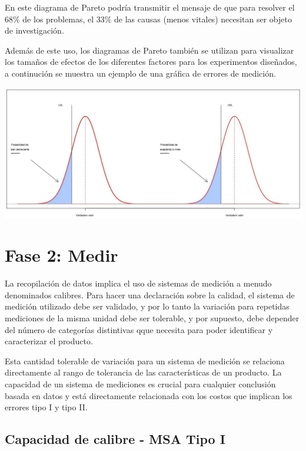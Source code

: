 \documentclass[
]{book}
\begin{document}
En este diagrama de Pareto podría transmitir el mensaje de que para resolver el \(68\%\) de los problemas, el \(33 \%\) de las causas (menos vitales) necesitan ser objeto de investigación.

Además de este uso, los diagramas de Pareto también se utilizan para visualizar los tamaños de efectos de los diferentes factores para los experimentos diseñados, a continución se muestra un ejemplo de una gráfica de errores de medición.

\includegraphics[width=7.29167in,height=\textheight]{graficos/erroresMedida.png}

\hypertarget{fase-2-medir}{%
\section{Fase 2: Medir}\label{fase-2-medir}}

La recopilación de datos implica el uso de sistemas de medición a menudo denominados calibres. Para hacer una declaración sobre la calidad, el sistema de medición utilizado debe ser validado, y por lo tanto la variación para repetidas mediciones de la misma unidad debe ser tolerable, y por supuesto, debe depender del número de categorías distintivas qque necesita para poder identificar y caracterizar el producto.

Esta cantidad tolerable de variación para un sistema de medición se relaciona directamente al rango de tolerancia de las características de un producto. La capacidad de un sistema de mediciones es crucial para cualquier conclusión basada en datos y está directamente relacionada con los costos que implican los errores tipo I y tipo II.

\hypertarget{capacidad-de-calibre---msa-tipo-i}{%
\subsection{Capacidad de calibre - MSA Tipo I}\label{capacidad-de-calibre---msa-tipo-i}}
\end{document}
